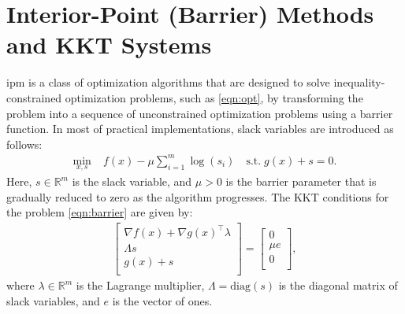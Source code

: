 \documentclass{article}
\begin{document}
\section{Interior-Point (Barrier) Methods and KKT Systems}\label{eqn:ipm}
\gls*{ipm} is a class of optimization algorithms that are designed to solve inequality-constrained optimization problems, such as \cref{eqn:opt}, by transforming the problem into a sequence of unconstrained optimization problems using a barrier function. In most of practical implementations, slack variables are introduced as follows:
\begin{align}\label{eqn:barrier}
  \min_{x,s } \; & f(x) - \mu \sum_{i=1}^m \log(s_i) \quad \text{s.t.} \; g(x) + s = 0.
\end{align}
Here, $s \in \mathbb{R}^m$ is the slack variable, and $\mu > 0$ is the barrier parameter that is gradually reduced to zero as the algorithm progresses.
The KKT conditions for the problem \cref{eqn:barrier} are given by:
\begin{align}\label{eqn:kkt}
  \begin{bmatrix}
    \nabla f(x) + \nabla g(x)^\top \lambda\\
    \Lambda s  \\
    g(x) + s \\
  \end{bmatrix} =
  \begin{bmatrix}
    0 \\
    \mu e\\
    0 \\
  \end{bmatrix},
\end{align}
where $\lambda \in \mathbb{R}^m$ is the Lagrange multiplier, $\Lambda = \text{diag}(s)$ is the diagonal matrix of slack variables, and $e$ is the vector of ones.
\end{document}
